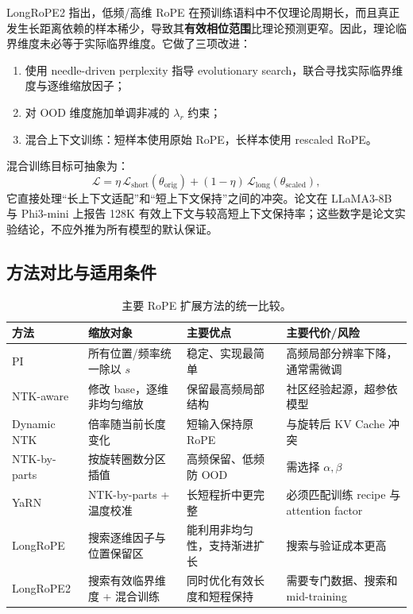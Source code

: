 \documentclass[UTF8,fontset=none,a4paper,10pt]{ctexart}
\newcommand{\term}[1]{\textbf{#1}}
\begin{document}
LongRoPE2 指出，低频/高维 RoPE 在预训练语料中不仅理论周期长，而且真正发生长距离依赖的样本稀少，导致其\term{有效相位范围}比理论预测更窄\cite{longrope2}。因此，理论临界维度未必等于实际临界维度。它做了三项改进：
\begin{enumerate}
  \item 使用 needle-driven perplexity 指导 evolutionary search，联合寻找实际临界维度与逐维缩放因子；
  \item 对 OOD 维度施加单调非减的 $\lambda_r$ 约束；
  \item 混合上下文训练：短样本使用原始 RoPE，长样本使用 rescaled RoPE。
\end{enumerate}
混合训练目标可抽象为：
\begin{equation}
  \mathcal{L}=\eta\,\mathcal{L}_{\mathrm{short}}(\theta_{\mathrm{orig}})
  +(1-\eta)\,\mathcal{L}_{\mathrm{long}}(\theta_{\mathrm{scaled}}),
  \label{eq:mixed-context-loss}
\end{equation}
它直接处理“长上下文适配”和“短上下文保持”之间的冲突。论文在 LLaMA3-8B 与 Phi3-mini 上报告 128K 有效上下文与较高短上下文保持率；这些数字是论文实验结论，不应外推为所有模型的默认保证\cite{longrope2}。

\subsection{方法对比与适用条件}

\begin{table}[htbp]
\centering
\small
\begin{tabularx}{\linewidth}{@{}p{2.4cm}p{3.0cm}p{3.2cm}X@{}}
\toprule
方法 & 缩放对象 & 主要优点 & 主要代价/风险 \\
\midrule
PI & 所有位置/频率统一除以 $s$ & 稳定、实现最简单 & 高频局部分辨率下降，通常需微调 \\
NTK-aware & 修改 base，逐维非均匀缩放 & 保留最高频局部结构 & 社区经验起源，超参依模型 \\
Dynamic NTK & 倍率随当前长度变化 & 短输入保持原 RoPE & 与旋转后 KV Cache 冲突 \\
NTK-by-parts & 按旋转圈数分区插值 & 高频保留、低频防 OOD & 需选择 $\alpha,\beta$ \\
YaRN & NTK-by-parts + 温度校准 & 长短程折中更完整 & 必须匹配训练 recipe 与 attention factor \\
LongRoPE & 搜索逐维因子与位置保留区 & 能利用非均匀性，支持渐进扩长 & 搜索与验证成本更高 \\
LongRoPE2 & 搜索有效临界维度 + 混合训练 & 同时优化有效长度和短程保持 & 需要专门数据、搜索和 mid-training \\
\bottomrule
\end{tabularx}
\caption{主要 RoPE 扩展方法的统一比较。}
\label{tab:rope-scaling}
\end{table}
\end{document}
